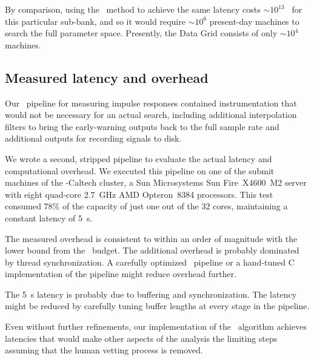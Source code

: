 By comparison, using the \TD\ method to achieve the same latency costs
$\sim$$10^{13}$ \flops\ for this particular sub-bank, and so it would require
$\sim$$10^6$ present-day machines to search the full parameter space.
Presently, the \LIGO{} Data Grid consists of only $\sim$$10^4$ machines.

\subsection{Measured latency and overhead}

Our \gstreamer\ pipeline for measuring impulse responses contained
instrumentation that would not be necessary for an actual search, including
additional interpolation filters to bring the early-warning outputs back to the
full sample rate and additional outputs for recording signals to disk.

We wrote a second, stripped pipeline to evaluate the actual latency and
computational overhead.  We executed this pipeline on one of the submit
machines of the \LIGO-Caltech cluster, a Sun Microsystems Sun
Fire\texttrademark\ X4600~M2 server with eight quad-core 2.7~GHz AMD
Opteron\texttrademark\ 8384 processors.  This test consumed 78\% of the
capacity of just one out of the 32 cores, maintaining a constant latency of
5~s.

The measured overhead is consistent to within an order of magnitude with the
lower bound from the \flops\ budget.  The additional overhead is probably
dominated by thread synchronization.  A carefully optimized \gstreamer\
pipeline or a hand-tuned C implementation of the pipeline might reduce overhead
further.

The 5~s latency is probably due to buffering and synchronization.  The latency
might be reduced by carefully tuning buffer lengths at every stage in
the pipeline.

Even without further refinements, our implementation of the \lloid\ algorithm
achieves latencies that would make other aspects of the analysis the limiting
steps assuming that the human vetting process is removed.  
